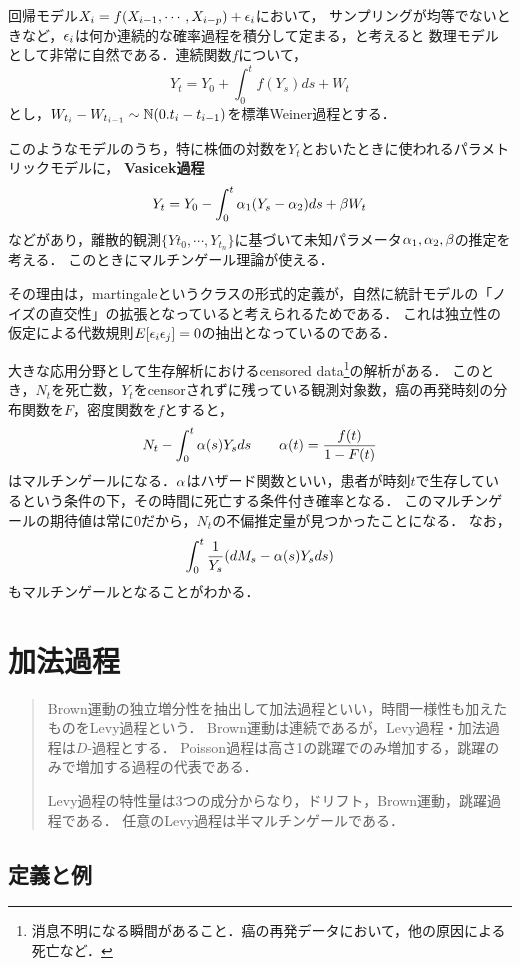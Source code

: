 \documentclass[uplatex,dvipdfmx]{jsreport}
\begin{document}
回帰モデル$X_i=f(X_{i-1},\cdots,X_{i-p})+\epsilon_i$において，
サンプリングが均等でないときなど，$\epsilon_i$は何か連続的な確率過程を積分して定まる，と考えると
数理モデルとして非常に自然である．連続関数$f$について，
\[Y_t=Y_0+\int^t_0f(Y_s)ds+W_t\]
とし，$W_{t_i}-W_{t_{i-1}}\sim\mathbb{N}(0.t_i-t_{i-1})$を標準Weiner過程とする．

このようなモデルのうち，特に株価の対数を$Y_t$とおいたときに使われるパラメトリックモデルに，
\textbf{Vasicek過程}
\[Y_t=Y_0-\int^t_0\alpha_1(Y_s-\alpha_2)ds+\beta W_t\]
などがあり，離散的観測$\{Y{t_0},\cdots,Y_{t_n}\}$に基づいて未知パラメータ$\alpha_1,\alpha_2,\beta$の推定を考える．
このときにマルチンゲール理論が使える．

その理由は，martingaleというクラスの形式的定義が，自然に統計モデルの「ノイズの直交性」の拡張となっていると考えられるためである．
これは独立性の仮定による代数規則$E[\epsilon_i\epsilon_j]=0$の抽出となっているのである．

大きな応用分野として生存解析におけるcensored data\footnote{消息不明になる瞬間があること．癌の再発データにおいて，他の原因による死亡など．}の解析がある．
このとき，$N_t$を死亡数，$Y_t$をcensorされずに残っている観測対象数，癌の再発時刻の分布関数を$F$，密度関数を$f$とすると，
\[N_t-\int^t_0\alpha(s)Y_sds\qquad\alpha(t)=\frac{f(t)}{1-F(t)}\]
はマルチンゲールになる．$\alpha$はハザード関数といい，患者が時刻$t$で生存しているという条件の下，その時間に死亡する条件付き確率となる．
このマルチンゲールの期待値は常に$0$だから，$N_t$の不偏推定量が見つかったことになる．
なお，
\[\int^t_0\frac{1}{Y_s}(dM_s-\alpha(s)Y_sds)\]
もマルチンゲールとなることがわかる．

\chapter{加法過程}

\begin{quotation}
    Brown運動の独立増分性を抽出して加法過程といい，時間一様性も加えたものをLevy過程という．
    Brown運動は連続であるが，Levy過程・加法過程は$D$-過程とする．
    Poisson過程は高さ1の跳躍でのみ増加する，跳躍のみで増加する過程の代表である．

    Levy過程の特性量は3つの成分からなり，ドリフト，Brown運動，跳躍過程である．
    任意のLevy過程は半マルチンゲールである．
\end{quotation}

\section{定義と例}
\end{document}
